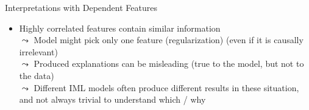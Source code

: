 \documentclass[11pt,compress,t,notes=noshow, aspectratio=169, xcolor=table]{beamer}
\begin{document}
\begin{frame}{Interpretations with Dependent Features}
\begin{itemize}


\item Highly correlated features contain similar information \\
$\leadsto$ Model might pick only one feature (regularization) (even if it is causally irrelevant)
\\
$\leadsto$ Produced explanations can be misleading (true to the model, but not to the data) %
\\
$\leadsto$ Different IML models often produce different results in these situation, and not always trivial to understand which / why 


\pause



\end{itemize}
\end{frame}
\end{document}

